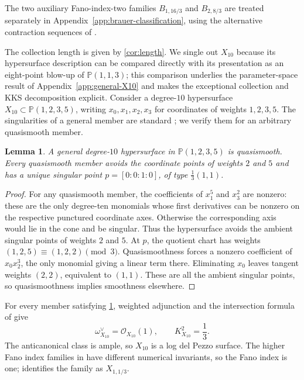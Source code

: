 \documentclass[11pt]{article}
\theoremstyle{plain}
\newtheorem{lemma}[lemma]{Lemma}
\theoremstyle{definition}
\theoremstyle{remark}
\newcommand{\Pp}{\mathbb P}
\newcommand{\OO}{\mathcal O}
\begin{document}
The two auxiliary Fano-index-two families \(B_{1,16/3}\) and
\(B_{2,8/3}\) are treated separately in
Appendix~\ref{app:brauer-classification}, using the alternative contraction
sequences of \cite[Remark~9]{Corti2016}.

The collection length is given by \cref{cor:length}. We single out \(X_{10}\)
because its hypersurface description can be compared directly with its
presentation as an eight-point blow-up of \(\Pp(1,1,3)\); this comparison
underlies the parameter-space result of Appendix~\ref{app:general-X10} and
makes the exceptional collection and KKS decomposition explicit.
Consider a degree-\(10\) hypersurface
\(X_{10}\subset\Pp(1,2,3,5)\), writing \(x_0,x_1,x_2,x_3\) for
coordinates of weights \(1,2,3,5\). The singularities of a general member
are standard \cite{JohnsonKollar2001,IanoFletcher2000}; we verify them for
an arbitrary quasismooth member.

\begin{lemma}\label{prop:X10-quasismooth}
A general degree-\(10\) hypersurface in \(\Pp(1,2,3,5)\) is
quasismooth. Every quasismooth member avoids the coordinate
points of weights \(2\) and \(5\) and has a unique singular point
\(p=[0:0:1:0]\), of type \(\frac13(1,1)\).
\end{lemma}

\begin{proof}
For any quasismooth member, the coefficients of
\(x_1^5\) and \(x_3^2\) are nonzero: these are the only degree-ten
monomials whose first derivatives can be nonzero on the respective
punctured coordinate axes. Otherwise the corresponding axis would lie in
the cone and be singular. Thus the hypersurface avoids the ambient
singular points of weights \(2\) and \(5\).
At \(p\), the quotient chart has weights \((1,2,5)\equiv(1,2,2)\pmod3\).
Quasismoothness forces a nonzero coefficient of \(x_0x_2^3\), the only
monomial giving a linear term there. Eliminating \(x_0\) leaves tangent
weights \((2,2)\), equivalent to \((1,1)\). These are all the ambient
singular points, so quasismoothness implies smoothness elsewhere.
\end{proof}

For every member satisfying \cref{prop:X10-quasismooth}, weighted
adjunction and the intersection formula
of \cite{Dolgachev1982} give
\[
\omega_{X_{10}}^\vee=\OO_{X_{10}}(1),
\qquad
K_{X_{10}}^2=\frac13.
\]
The anticanonical class is ample, so \(X_{10}\) is a log del Pezzo surface.
The higher Fano index families in \cite[Theorem~3]{Corti2016} have different
numerical invariants, so the Fano index is one;
\cite[Theorem~4 and Table~2]{Corti2016} identifies the family as
\(X_{1,1/3}\).
\end{document}

